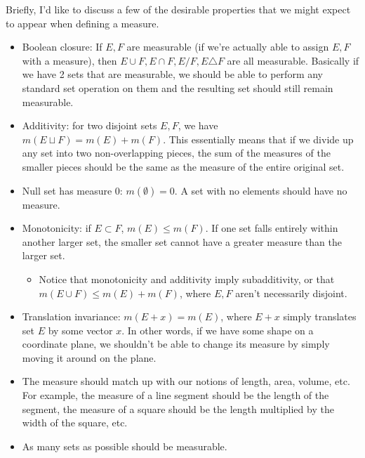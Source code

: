 \documentclass[answers,12pt]{exam}
\begin{document}
Briefly, I'd like to discuss a few of the desirable properties that we might expect to appear when defining a measure.
\begin{itemize}
    \item Boolean closure: If $E,F$ are measurable (if we're actually able to assign $E,F$ with a measure), then $E \cup F, E \cap F, E/F, E \triangle F$ are all measurable.
    Basically if we have 2 sets that are measurable, we should be able to perform any standard set operation on them and the resulting set should still remain measurable.
    \item Additivity: for two disjoint sets $E,F$, we have $m(E \sqcup F) = m(E) + m(F)$.
    This essentially means that if we divide up any set into two non-overlapping pieces, the sum of the measures of the smaller pieces should be the same as the measure of the entire original set.
    \item Null set has measure 0: $m(\emptyset) = 0$.
    A set with no elements should have no measure.
    \item Monotonicity: if $E \subset F$, $m(E) \leq m(F)$. 
    If one set falls entirely within another larger set, the smaller set cannot have a greater measure than the larger set.
    \begin{itemize}
        \item Notice that monotonicity and additivity imply subadditivity, or that $m(E \cup F) \leq m(E) + m(F)$, where $E,F$ aren't necessarily disjoint.
    \end{itemize}
    \item Translation invariance: $m(E+x) = m(E)$, where $E+x$ simply translates set $E$ by some vector $x$.
    In other words, if we have some shape on a coordinate plane, we shouldn't be able to change its measure by simply moving it around on the plane.
    \item The measure should match up with our notions of length, area, volume, etc.
    For example, the measure of a line segment should be the length of the segment, the measure of a square should be the length multiplied by the width of the square, etc.
    \item As many sets as possible should be measurable.
\end{itemize}
\end{document}
